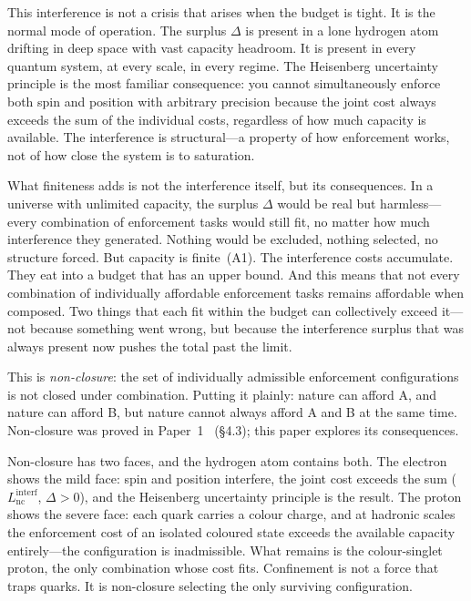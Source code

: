 \documentclass[11pt]{article}
\begin{document}
This interference is not a crisis that arises when the budget is tight.  It is the normal mode of operation.  The surplus $\Delta$ is present in a lone hydrogen atom drifting in deep space with vast capacity headroom.  It is present in every quantum system, at every scale, in every regime.  The Heisenberg uncertainty principle is the most familiar consequence: you cannot simultaneously enforce both spin and position with arbitrary precision because the joint cost always exceeds the sum of the individual costs, regardless of how much capacity is available.  The interference is structural---a property of how enforcement works, not of how close the system is to saturation.

What finiteness adds is not the interference itself, but its consequences.  In a universe with unlimited capacity, the surplus $\Delta$ would be real but harmless---every combination of enforcement tasks would still fit, no matter how much interference they generated.  Nothing would be excluded, nothing selected, no structure forced.  But capacity is finite~(A1).  The interference costs accumulate.  They eat into a budget that has an upper bound.  And this means that not every combination of individually affordable enforcement tasks remains affordable when composed.  Two things that each fit within the budget can collectively exceed it---not because something went wrong, but because the interference surplus that was always present now pushes the total past the limit.

This is \emph{non-closure}: the set of individually admissible enforcement configurations is not closed under combination.  Putting it plainly: nature can afford A, and nature can afford B, but nature cannot always afford A and B at the same time.  Non-closure was proved in Paper~1~\cite{BrookePaper1} (\S4.3); this paper explores its consequences.

Non-closure has two faces, and the hydrogen atom contains both.  The electron shows the mild face: spin and position interfere, the joint cost exceeds the sum ($L_{\mathrm{nc}}^{\mathrm{interf}}$, $\Delta > 0$), and the Heisenberg uncertainty principle is the result.  The proton shows the severe face: each quark carries a colour charge, and at hadronic scales the enforcement cost of an isolated coloured state exceeds the available capacity entirely---the configuration is inadmissible.  What remains is the colour-singlet proton, the only combination whose cost fits.  Confinement is not a force that traps quarks.  It is non-closure selecting the only surviving configuration.
\end{document}
